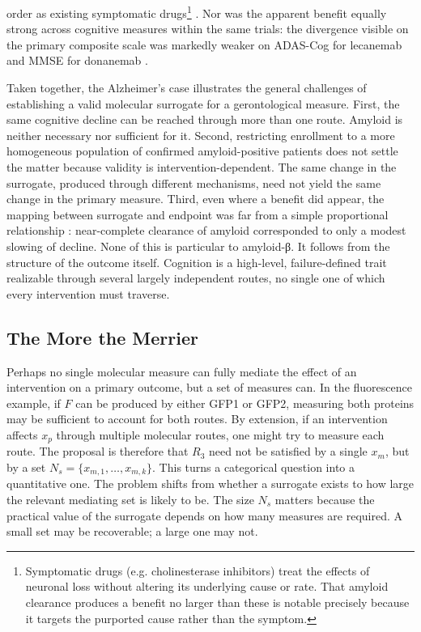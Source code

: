\documentclass[twocolumn]{article} %
\begin{document}
order as existing symptomatic drugs\footnote{Symptomatic drugs (e.g. cholinesterase inhibitors) treat the effects of neuronal loss without altering its underlying cause or rate. That amyloid clearance produces a benefit no larger than these is notable precisely because it targets the purported cause rather than the symptom.} \cite{daly2024lecanemab}. Nor was the apparent benefit equally strong across cognitive measures within the same trials: the divergence visible on the primary composite scale was markedly weaker on ADAS-Cog for lecanemab and MMSE for donanemab \citep[d]{daly2024lecanemab}.

Taken together, the Alzheimer's case illustrates the general challenges of establishing a valid molecular surrogate for a gerontological measure. First, the same cognitive decline can be reached through more than one route. Amyloid is neither necessary nor sufficient for it. Second, restricting enrollment to a more homogeneous population of confirmed amyloid-positive patients does not settle the matter because validity is intervention-dependent. The same change in the surrogate, produced through different mechanisms, need not yield the same change in the primary measure. Third, even where a benefit did appear, the mapping between surrogate and endpoint was far from a simple proportional relationship \cite{wallach2024associations, mead2023lecanemab}\citep[b]{lancet2022lecanemab}: near-complete clearance of amyloid corresponded to only a modest slowing of decline. None of this is particular to amyloid-β. It follows from the structure of the outcome itself. Cognition is a high-level, failure-defined trait realizable through several largely independent routes, no single one of which every intervention must traverse.

\subsection{The More the Merrier}

Perhaps no single molecular measure can fully mediate the effect of an intervention on a primary outcome, but a set of measures can. In the fluorescence example, if $F$ can be produced by either GFP1 or GFP2, measuring both proteins may be sufficient to account for both routes. By extension, if an intervention affects $x_p$ through multiple molecular routes, one might try to measure each route. The proposal is therefore that $R_3$ need not be satisfied by a single $x_m$, but by a set $N_s = \{x_{m,1}, \ldots, x_{m,k}\}$. This turns a categorical question into a quantitative one. The problem shifts from whether a surrogate exists to how large the relevant mediating set is likely to be. The size $N_s$ matters because the practical value of the surrogate depends on how many measures are required. A small set may be recoverable; a large one may not.
\end{document}
